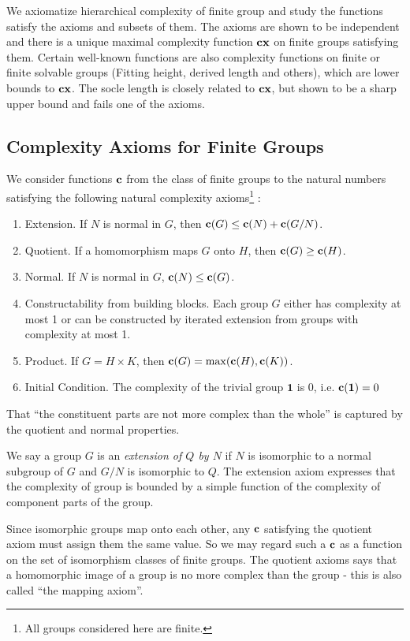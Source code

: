 \documentclass[a4paper,11pt]{amsart}
\theoremstyle{definition}
\newcommand{\cx}{\mbox{\bf cx}}
\renewcommand{\c}{\mbox{\bf c}}
\newcommand{\1}{{\mathbf 1}}
\begin{document}
We axiomatize hierarchical complexity of finite group and study the functions satisfy the axioms and subsets of them.  The axioms are shown to be independent and there is a unique maximal complexity function $\cx$ on finite groups satisfying them.  Certain well-known functions are also complexity functions on finite or finite solvable groups (Fitting height, derived length and others), which are lower bounds to $\cx$. 
The socle length is closely related to $\cx$, but shown to be a sharp upper bound and fails one of the axioms. \\

\subsection{Complexity Axioms for Finite Groups}\label{CpxAxioms}
We consider functions $\c$ from the class of finite groups to the natural numbers satisfying the following natural complexity axioms\footnote{All groups considered here are finite. } :

\begin{enumerate}
\item Extension.  If   $N$ is normal in $G$, then $\c(G) \leq \c(N) + \c(G/N)$.
\item Quotient. 
If a homomorphism maps $G$ onto $H$, then $\c(G)\geq \c(H)$.
\item Normal.  If $N$ is normal in $G$, $\c(N) \leq \c(G)$.
\item Constructability from building blocks.   Each group $G$ either has complexity at most 1 or can be constructed by iterated extension from groups with complexity at most 1.   

\item  Product.    If $G= H \times K$,  then $\c(G)=\max({\c(H), \c(K)})$.
\item Initial Condition. The complexity of the trivial group $\1$ is 0, i.e. $\c(\1)=0$

\end{enumerate}

That ``the constituent parts are not more complex than the whole'' is captured by the quotient and normal properties. 

We say a group $G$ is an {\em extension of $Q$ by $N$} if $N$ is isomorphic to a normal subgroup of  $G$ and $G/N$ is isomorphic to $Q$.
The extension axiom expresses that the complexity of group is bounded by a simple function of the complexity of  component parts of the group. 

Since isomorphic groups map onto each other, any $\c$ satisfying the quotient axiom must assign them the same value.
So we may regard such a $\c$ as a function on the set of isomorphism classes of finite groups.  The quotient axioms says that a homomorphic image of a group is no more complex than the group - this is also called ``the mapping axiom''. 
\end{document}
